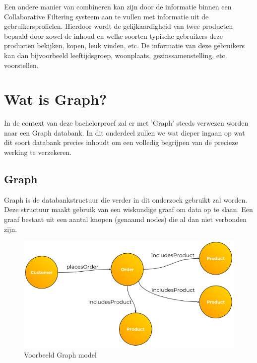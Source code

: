 Een andere manier van combineren kan zijn door de informatie binnen een Collaborative Filtering systeem aan te vullen met informatie uit de gebruikersprofielen. Hierdoor wordt de gelijkaardigheid van twee producten bepaald door zowel de inhoud en welke soorten typische gebruikers deze producten bekijken, kopen, leuk vinden, etc.
De informatie van deze gebruikers kan dan bijvoorbeeld leeftijdsgroep, woonplaats, gezinssamenstelling, etc. voorstellen.


\section{Wat is Graph?}
\label{sec:wat is Graph?}

In de context van deze bachelorproef zal er met 'Graph' steeds verwezen worden naar een Graph databank. In dit onderdeel zullen we wat dieper ingaan op wat dit soort databank precies inhoudt om een volledig begrijpen van de precieze werking te verzekeren. 

\subsection{Graph}
\label{sec:Graph}

Graph is de databankstructuur die verder in dit onderzoek gebruikt zal worden. Deze structuur maakt gebruik van een wiskundige graaf om data op te slaan. Een graaf bestaat uit een aantal knopen (genaamd nodes) die al dan niet verbonden zijn. 

\begin{figure} [ht]
	\centering
\includegraphics[width=\linewidth]{img/Customer-Order-Example-Graph.png}
	\caption[Voorbeeld Graph model]{Voorbeeld Graph model}
	\label{fig:GraphModelExample}
\end{figure}


